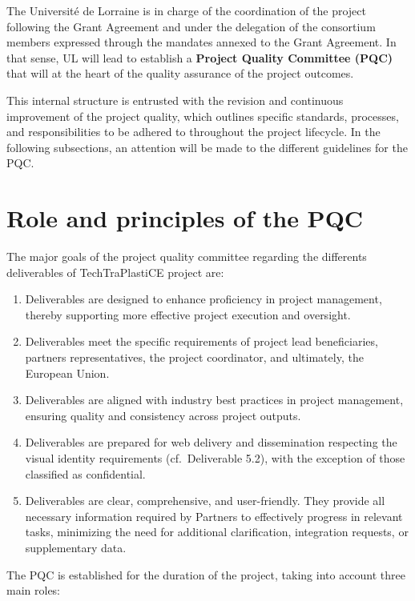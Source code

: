 \documentclass[
  12pt,
  oneside]{book}
\begin{document}
The Université de Lorraine is in charge of the coordination of the
project following the Grant Agreement and under the delegation of the
consortium members expressed through the mandates annexed to the Grant
Agreement. In that sense, UL will lead to establish a \textbf{Project
Quality Committee (PQC)} that will at the heart of the quality assurance
of the project outcomes.

This internal structure is entrusted with the revision and continuous
improvement of the project quality, which outlines specific standards,
processes, and responsibilities to be adhered to throughout the project
lifecycle. In the following subsections, an attention will be made to
the different guidelines for the PQC.

\section{Role and principles of the
PQC}\label{role-and-principles-of-the-pqc}

The major goals of the project quality committee regarding the
differents deliverables of TechTraPlastiCE project are:

\begin{enumerate}
\def\labelenumi{\arabic{enumi}.}
\item
  Deliverables are designed to enhance proficiency in project
  management, thereby supporting more effective project execution and
  oversight.
\item
  Deliverables meet the specific requirements of project lead
  beneficiaries, partners representatives, the project coordinator, and
  ultimately, the European Union.
\item
  Deliverables are aligned with industry best practices in project
  management, ensuring quality and consistency across project outputs.
\item
  Deliverables are prepared for web delivery and dissemination
  respecting the visual identity requirements (cf.~Deliverable 5.2),
  with the exception of those classified as confidential.
\item
  Deliverables are clear, comprehensive, and user-friendly. They provide
  all necessary information required by Partners to effectively progress
  in relevant tasks, minimizing the need for additional clarification,
  integration requests, or supplementary data.
\end{enumerate}

The PQC is established for the duration of the project, taking into
account three main roles:
\end{document}
